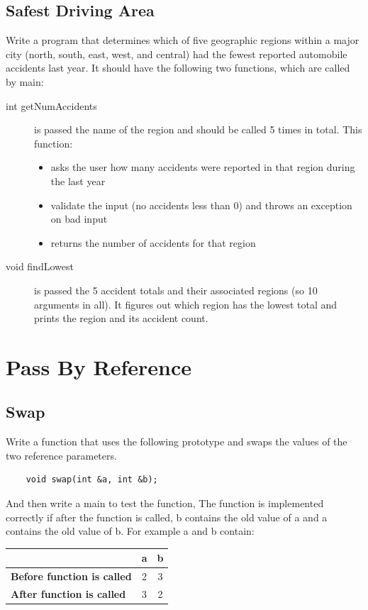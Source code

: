 \documentclass{article}
\begin{document}
\subsection{Safest Driving Area}
Write a program that determines which of five geographic regions within a major city (north, south, east, west, and central) had the fewest reported automobile  accidents last year. It should have the following two functions, which are called by main:
\begin{description}
\item[int getNumAccidents] is passed the name of the region and should be called 5 times in total. This function:
		\begin{itemize}
\item asks the user how many accidents were reported in that region during the last year
\item validate the input (no accidents less than 0) and throws an exception on bad input
\item returns the number of accidents for that region
\end{itemize}
\item[void findLowest] is passed the 5 accident totals and their associated regions (so 10 arguments in all). It figures out which region has the lowest total and prints the region and its accident count.
\end{description}
\section{Pass By Reference}
\subsection{Swap}
Write a function that uses the following prototype and swaps the values of the two reference parameters.
\begin{verbatim}
	void swap(int &a, int &b);
\end{verbatim}
 And then write a main to test the function, The function is implemented correctly if after the function is called, b contains the old value of a and a contains the old value of b. For example a and b contain:\\
\begin{tabular}{|l|c|c|}
\hline
& \textbf{a} & \textbf{b}\\
\hline
\textbf{Before function is called} & 2 & 3\\
\hline
\textbf{After function is called} & 3 & 2\\
\hline
\end{tabular}
\end{document}
